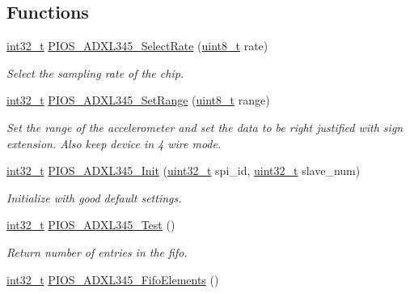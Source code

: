 \subsection*{Functions}
\begin{DoxyCompactItemize}
\item 
\hyperlink{group___n_a_m_e_gafd12020da5a235dfcf0c3c748fb5baed}{int32\-\_\-t} \hyperlink{group___p_i_o_s___a_d_x_l345_gaedeba8a50a27f4f4419dd30ba5466233}{P\-I\-O\-S\-\_\-\-A\-D\-X\-L345\-\_\-\-Select\-Rate} (\hyperlink{stdint_8h_aba7bc1797add20fe3efdf37ced1182c5}{uint8\-\_\-t} rate)
\begin{DoxyCompactList}\small\item\em Select the sampling rate of the chip. \end{DoxyCompactList}\item 
\hyperlink{group___n_a_m_e_gafd12020da5a235dfcf0c3c748fb5baed}{int32\-\_\-t} \hyperlink{group___p_i_o_s___a_d_x_l345_gad60a361fc357f7a08a7fc5586958e470}{P\-I\-O\-S\-\_\-\-A\-D\-X\-L345\-\_\-\-Set\-Range} (\hyperlink{stdint_8h_aba7bc1797add20fe3efdf37ced1182c5}{uint8\-\_\-t} range)
\begin{DoxyCompactList}\small\item\em Set the range of the accelerometer and set the data to be right justified with sign extension. Also keep device in 4 wire mode. \end{DoxyCompactList}\item 
\hyperlink{group___n_a_m_e_gafd12020da5a235dfcf0c3c748fb5baed}{int32\-\_\-t} \hyperlink{group___p_i_o_s___a_d_x_l345_ga1862ab6db103692d9564b3db867f7dd8}{P\-I\-O\-S\-\_\-\-A\-D\-X\-L345\-\_\-\-Init} (\hyperlink{stdint_8h_a435d1572bf3f880d55459d9805097f62}{uint32\-\_\-t} spi\-\_\-id, \hyperlink{stdint_8h_a435d1572bf3f880d55459d9805097f62}{uint32\-\_\-t} slave\-\_\-num)
\begin{DoxyCompactList}\small\item\em Initialize with good default settings. \end{DoxyCompactList}\item 
\hyperlink{group___n_a_m_e_gafd12020da5a235dfcf0c3c748fb5baed}{int32\-\_\-t} \hyperlink{group___p_i_o_s___a_d_x_l345_gae592086eb373986b98f2a5f865736151}{P\-I\-O\-S\-\_\-\-A\-D\-X\-L345\-\_\-\-Test} ()
\begin{DoxyCompactList}\small\item\em Return number of entries in the fifo. \end{DoxyCompactList}\item 
\hyperlink{group___n_a_m_e_gafd12020da5a235dfcf0c3c748fb5baed}{int32\-\_\-t} \hyperlink{group___p_i_o_s___a_d_x_l345_ga9d29094128a0b4a9882fbf034017533b}{P\-I\-O\-S\-\_\-\-A\-D\-X\-L345\-\_\-\-Fifo\-Elements} ()

\end{DoxyCompactItemize}
